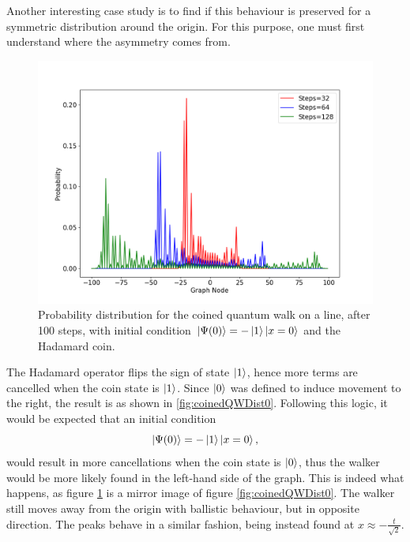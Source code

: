 \documentclass[../../dissertation.tex]{subfiles}
\begin{document}
Another interesting case study is to find if this behaviour is preserved for a symmetric distribution around the origin. For this purpose, one must first understand where the asymmetry comes from.
\begin{figure}[!h]
	\centering
	\includegraphics[scale=0.40]{img/CoinedQuantumWalk/CoinedMultiple_psi1_3264128.png}
	\caption{Probability distribution for the coined quantum walk on a line, after 100 steps, with initial condition $\ket{\Psi(0)}=-\ket{1}\ket{x=0}$ and the Hadamard coin.} 
	\label{fig:coinedQWDist1}
\end{figure}
The Hadamard operator flips the sign of state $\ket{1}$, hence more terms are cancelled when the coin state is $\ket{1}$. Since $\ket{0}$ was defined to induce movement to the right, the result is as shown in \ref{fig:coinedQWDist0}. Following this logic, it would be expected that an initial condition 
\begin{equation}
	\ket{\Psi(0)} = -\ket{1}\ket{x=0},
	\label{eq:coinedQWInitCond1}
\end{equation}
would result in more cancellations when the coin state is $\ket{0}$, thus the walker would be more likely found in the left-hand side of the graph. This is indeed what happens, as figure \ref{fig:coinedQWDist1} is a mirror image of figure \ref{fig:coinedQWDist0}. The walker still moves away from the origin with ballistic behaviour, but in opposite direction. The peaks behave in a similar fashion, being instead found at $x \approx -\frac{t}{\sqrt{2}}$.\par  
\end{document}
